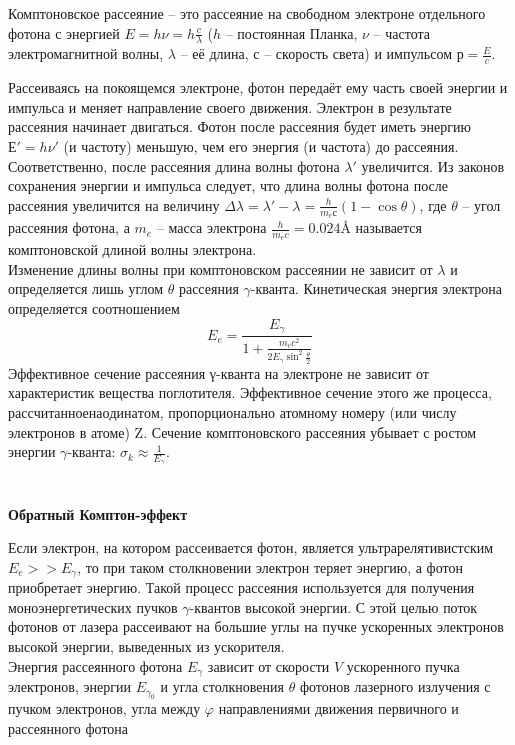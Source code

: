 	\begin{definition}
		    Комптоновское рассеяние – это рассеяние на свободном электроне отдельного фотона с энергией $E = h\nu = h\frac{c}{\lambda}$ ($h$ – постоянная Планка, $ν$ – частота электромагнитной волны, $λ$ – её длина, $с$ – скорость света) и импульсом $р = \frac{E}{c}$.
	\end{definition}

	Рассеиваясь на покоящемся электроне, фотон передаёт ему часть своей энергии и импульса и меняет направление своего движения. Электрон в результате рассеяния начинает двигаться. Фотон после рассеяния будет иметь энергию $Е' = hν'$ (и частоту) меньшую, чем его энергия (и частота) до рассеяния. Соответственно, после рассеяния длина волны фотона $λ'$ увеличится. Из законов сохранения энергии и импульса следует, что длина волны фотона после рассеяния увеличится на величину $\Delta \lambda = \lambda' - \lambda = \frac{h}{m_e с}(1-\cos\theta)$, где $θ$ – угол рассеяния фотона, а $m_e$ – масса электрона $\frac{h}{m_e c} = 0.024 Å$ называется комптоновской длиной волны электрона.\\
	
	Изменение длины волны при комптоновском рассеянии не зависит от $λ$ и определяется лишь углом $θ$ рассеяния $γ$-кванта. Кинетическая энергия электрона определяется соотношением
	$$E_e = \frac{E_γ}{1+\frac{m_e c^2}{2E_γ \sin^2\frac{\theta}{2}}}$$
	Эффективное сечение рассеяния γ-кванта на электроне не зависит от характеристик вещества поглотителя. Эффективное сечение этого же процесса,$ рассчитанное на один атом$, пропорционально атомному номеру (или числу электронов в атоме) Z.
	Сечение комптоновского рассеяния убывает с ростом энергии $γ$-кванта: $\sigma_k \approx \frac{1}{E_γ}$.
	\\\\\\
	\textbf{Обратный Комптон-эффект}
	
	Если электрон, на котором рассеивается фотон, является ультрарелятивистским $E_e >> E_γ$, то при таком столкновении электрон теряет энергию, а фотон приобретает энергию. Такой процесс рассеяния используется для получения моноэнергетических пучков $γ$-квантов высокой энергии. С этой целью поток фотонов от лазера рассеивают на большие углы на пучке ускоренных электронов высокой энергии, выведенных из ускорителя.\\
	
	Энергия рассеянного фотона $E_γ$ зависит от скорости $V$ ускоренного пучка электронов, энергии $E_{γ_0}$ и угла столкновения $θ$ фотонов лазерного излучения с пучком электронов, угла между $φ$ направлениями движения первичного и рассеянного фотона
	
